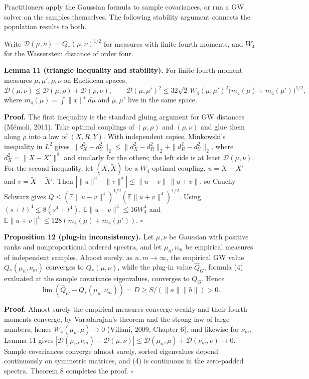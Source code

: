 \documentclass[
  british,
  11pt,
  a4paper,
]{article}
\begin{document}
Practitioners apply the Gaussian formula to sample covariances, or run a
GW solver on the samples themselves. The following stability argument
connects the population results to both.

Write \(\mathcal D(\mu,\nu)=Q_*(\mu,\nu)^{1/2}\) for measures with
finite fourth moments, and \(W_4\) for the Wasserstein distance of order
four.

\textbf{Lemma 11 (triangle inequality and stability).} For
finite-fourth-moment measures \(\mu,\mu',\rho,\nu\) on Euclidean spaces,
\[
\mathcal D(\mu,\nu)\leq\mathcal D(\mu,\rho)+\mathcal D(\rho,\nu),\qquad
\mathcal D(\mu,\mu')^2\leq32\sqrt2\,W_4(\mu,\mu')^2\big(m_4(\mu)+m_4(\mu')\big)^{1/2},
\] where \(m_4(\mu)=\int\|x\|^4d\mu\) and \(\mu,\mu'\) live in the same
space.

\textbf{Proof.} The first inequality is the standard gluing argument for
GW distances (Mémoli, 2011). Take optimal couplings of \((\mu,\rho)\)
and \((\rho,\nu)\) and glue them along \(\rho\) into a law of
\((X,R,Y)\). With independent copies, Minkowski's inequality in \(L^2\)
gives \(\|d_X^2-d_Y^2\|_2\leq\|d_X^2-d_R^2\|_2+\|d_R^2-d_Y^2\|_2\),
where \(d_X^2=\|X-X'\|^2\) and similarly for the others; the left side
is at least \(\mathcal D(\mu,\nu)\). For the second inequality, let
\((X,\tilde X)\) be a \(W_4\)-optimal coupling, \(u=X-X'\) and
\(v=\tilde X-\tilde X'\). Then
\(|\|u\|^2-\|v\|^2|\leq\|u-v\|\,\|u+v\|\), so Cauchy--Schwarz gives
\(Q\leq(\mathbb E\|u-v\|^4)^{1/2}(\mathbb E\|u+v\|^4)^{1/2}\). Using
\((s+t)^4\leq8(s^4+t^4)\), \(\mathbb E\|u-v\|^4\leq16W_4^4\) and
\(\mathbb E\|u+v\|^4\leq128(m_4(\mu)+m_4(\mu'))\). \(\square\)

\textbf{Proposition 12 (plug-in inconsistency).} Let \(\mu,\nu\) be
Gaussian with positive ranks and nonproportional ordered spectra, and
let \(\mu_n,\nu_m\) be empirical measures of independent samples. Almost
surely, as \(n,m\to\infty\), the empirical GW value \(Q_*(\mu_n,\nu_m)\)
converges to \(Q_*(\mu,\nu)\), while the plug-in value \(\hat Q_G\),
formula (4) evaluated at the sample covariance eigenvalues, converges to
\(Q_G\). Hence \[
\lim(\hat Q_G-Q_*(\mu_n,\nu_m))=D\geq S/(\|a\|\|b\|)>0 .
\]

\textbf{Proof.} Almost surely the empirical measures converge weakly and
their fourth moments converge, by Varadarajan's theorem and the strong
law of large numbers; hence \(W_4(\mu_n,\mu)\to0\) (Villani, 2009,
Chapter 6), and likewise for \(\nu_m\). Lemma 11 gives
\(|\mathcal D(\mu_n,\nu_m)-\mathcal D(\mu,\nu)|\leq\mathcal D(\mu_n,\mu)+\mathcal D(\nu_m,\nu)\to0\).
Sample covariances converge almost surely, sorted eigenvalues depend
continuously on symmetric matrices, and (4) is continuous in the
zero-padded spectra. Theorem 8 completes the proof. \(\square\)
\end{document}
